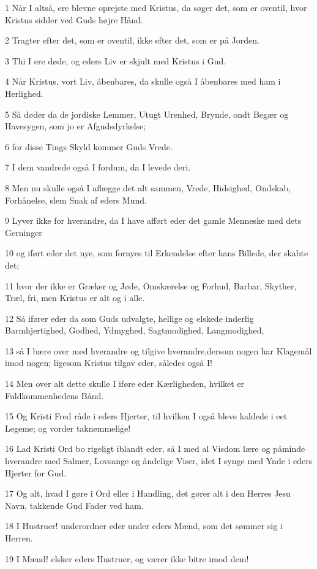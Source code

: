 \par 1 Når I altså, ere blevne oprejste med Kristus, da søger det, som er oventil, hvor Kristus sidder ved Guds højre Hånd.
\par 2 Tragter efter det, som er oventil, ikke efter det, som er på Jorden.
\par 3 Thi I ere døde, og eders Liv er skjult med Kristus i Gud.
\par 4 Når Kristus, vort Liv, åbenbares, da skulle også I åbenbares med ham i Herlighed.
\par 5 Så døder da de jordiske Lemmer, Utugt Urenhed, Brynde, ondt Begær og Havesygen, som jo er Afgudsdyrkelse;
\par 6 for disse Tings Skyld kommer Guds Vrede.
\par 7 I dem vandrede også I fordum, da I levede deri.
\par 8 Men nu skulle også I aflægge det alt sammen, Vrede, Hidsighed, Ondskab, Forhånelse, slem Snak af eders Mund.
\par 9 Lyver ikke for hverandre, da I have afført eder det gamle Menneske med dets Gerninger
\par 10 og iført eder det nye, som fornyes til Erkendelse efter hans Billede, der skabte det;
\par 11 hvor der ikke er Græker og Jøde, Omskærelse og Forhud, Barbar, Skyther, Træl, fri, men Kristus er alt og i alle.
\par 12 Så ifører eder da som Guds udvalgte, hellige og elskede inderlig Barmhjertighed, Godhed, Ydmyghed, Sagtmodighed, Langmodighed,
\par 13 så I bære over med hverandre og tilgive hverandre,dersom nogen har Klagemål imod nogen; ligesom Kristus tilgav eder, således også I!
\par 14 Men over alt dette skulle I iføre eder Kærligheden, hvilket er Fuldkommenhedens Bånd.
\par 15 Og Kristi Fred råde i eders Hjerter, til hvilken I også bleve kaldede i eet Legeme; og vorder taknemmelige!
\par 16 Lad Kristi Ord bo rigeligt iblandt eder, så I med al Visdom lære og påminde hverandre med Salmer, Lovsange og åndelige Viser, idet I synge med Ynde i eders Hjerter for Gud.
\par 17 Og alt, hvad I gøre i Ord eller i Handling, det gører alt i den Herres Jesu Navn, takkende Gud Fader ved ham.
\par 18 I Hustruer! underordner eder under eders Mænd, som det sømmer sig i Herren.
\par 19 I Mænd! elsker eders Hustruer, og værer ikke bitre imod dem!
